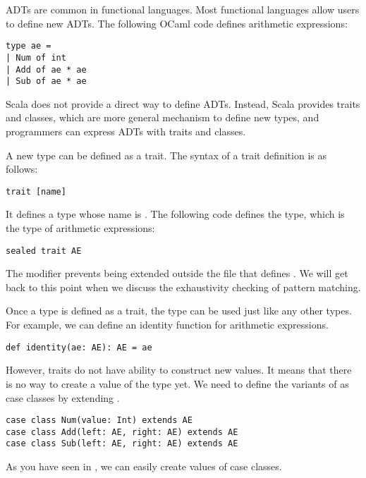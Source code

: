 ADTs are common in functional languages. Most functional
languages allow users to define new ADTs. The following OCaml
code defines arithmetic expressions:

\begin{verbatim}
type ae =
| Num of int
| Add of ae * ae
| Sub of ae * ae
\end{verbatim}

Scala does not provide a direct way to define ADTs. Instead, Scala provides
traits and classes, which are more general mechanism to define new types,
and programmers can express ADTs with traits and classes.

A new type can be defined as a trait.
The syntax of a trait definition is as follows:

\begin{verbatim}
trait [name]
\end{verbatim}

It defines a type whose name is \code{[name]}.
The following code defines the  type,
which is the type of arithmetic expressions:

\begin{verbatim}
sealed trait AE
\end{verbatim}

The  modifier prevents  being extended outside the file
that defines . We will get back to this point when we discuss the
exhaustivity checking of pattern matching.

Once a type is defined as a trait, the type can be used just like any other
types. For example, we can define an identity function for arithmetic
expressions.

\begin{verbatim}
def identity(ae: AE): AE = ae
\end{verbatim}

However, traits do not have ability to construct new values. It means that there
is no way to create a value of the type  yet. We need to define the
variants of  as case classes by extending .

\begin{verbatim}
case class Num(value: Int) extends AE
case class Add(left: AE, right: AE) extends AE
case class Sub(left: AE, right: AE) extends AE
\end{verbatim}

As you have seen in , we can easily create values of case classes.

